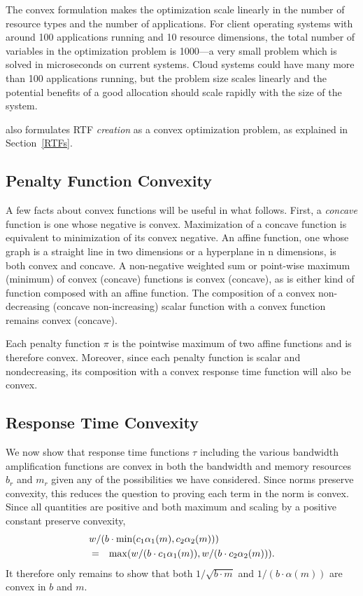 The convex formulation makes the optimization scale linearly in the
number of resource types and the number of applications.  For client
operating systems with around 100 applications running and 10 resource
dimensions, the total number of variables in the optimization problem
is 1000---a very small problem which is solved in microseconds on
current systems.  Cloud systems could have many more than 100
applications running, but the problem size scales linearly and the
potential benefits of a good allocation should scale rapidly with the
size of the system.

\pacora also formulates RTF \emph{creation} as a convex optimization
problem, as explained in Section~\ref{RTFs}.

\subsection{Penalty Function Convexity}
A few facts about convex functions will be useful in what follows.
First, a \emph{concave} function is one whose negative is convex.
Maximization of a concave function is equivalent to minimization of its convex negative.
An affine function, one whose graph is a straight line in two dimensions or a hyperplane in n dimensions,
is both convex and concave.  A non-negative weighted sum or point-wise maximum (minimum) of convex (concave) functions is convex (concave), as is either kind of function composed with an affine function.  The composition of a convex non-decreasing (concave non-increasing) scalar function with a convex function remains convex (concave).

Each penalty function $\pi$ is the pointwise maximum of two affine functions and is therefore convex.
Moreover, since each penalty function is scalar and nondecreasing,
its composition with a convex response time function will also be convex.

\subsection{Response Time Convexity}
We now show that response time functions $\tau$ including the various bandwidth amplification functions are convex
in both the bandwidth and memory resources $b_r$ and $m_r$ given any of the possibilities we have considered.
Since norms preserve convexity, this reduces the question to proving each term in the norm is convex.
Since all quantities are positive and both maximum and scaling by a positive constant preserve convexity,
\begin{eqnarray*}
\lefteqn{w/(b\cdot\min(c_1\alpha_1(m),c_2\alpha_2(m)))}   \\
&=& \max(w/(b\cdot c_1\alpha_1(m)),w/(b\cdot c_2\alpha_2(m))).
\end{eqnarray*}
It therefore only remains to show that both $1/\sqrt{b\cdot m}$ and $1/(b\cdot\alpha(m))$ are convex in $b$ and $m$.

